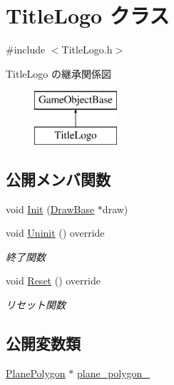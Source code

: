 \hypertarget{class_title_logo}{}\section{Title\+Logo クラス}
\label{class_title_logo}


{\ttfamily \#include $<$Title\+Logo.\+h$>$}

Title\+Logo の継承関係図\begin{figure}[H]
\begin{center}
\leavevmode
\includegraphics[height=2.000000cm]{class_title_logo}
\end{center}
\end{figure}
\subsection*{公開メンバ関数}
\begin{DoxyCompactItemize}
\item 
void \mbox{\hyperlink{class_title_logo_a1e07aae4771bd7a44cb7e3b55b72b9f3}{Init}} (\mbox{\hyperlink{class_draw_base}{Draw\+Base}} $\ast$draw)
\item 
void \mbox{\hyperlink{class_title_logo_a177943b3becc80fcdb7a34f131b07ee9}{Uninit}} () override
\begin{DoxyCompactList}\small\item\em 終了関数 \end{DoxyCompactList}\item 
void \mbox{\hyperlink{class_title_logo_a8bca39d06592b95b26024c2d86ac349c}{Reset}} () override
\begin{DoxyCompactList}\small\item\em リセット関数 \end{DoxyCompactList}\end{DoxyCompactItemize}
\subsection*{公開変数類}
\begin{DoxyCompactItemize}
\item 
\mbox{\hyperlink{class_plane_polygon}{Plane\+Polygon}} $\ast$ \mbox{\hyperlink{class_title_logo_a842ef60ff79632e1dad76599952eb95a}{plane\+\_\+polygon\+\_\+}}
\end{DoxyCompactItemize}
